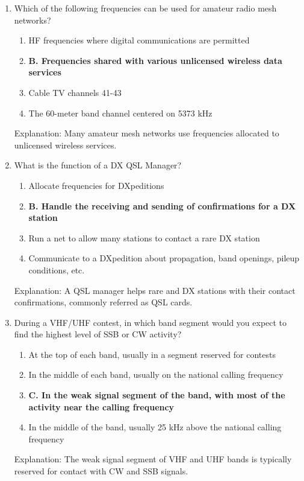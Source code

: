 \begin{enumerate}
    \item Which of the following frequencies can be used for amateur radio mesh networks?
        \begin{enumerate}
         \item  HF frequencies where digital communications are permitted
        \item \textbf{B. Frequencies shared with various unlicensed wireless data services}
     \item  Cable TV channels 41-43
       \item  The 60-meter band channel centered on 5373 kHz
     \end{enumerate}
        \textcolor{myred}{Explanation:}
     Many amateur mesh networks use frequencies allocated to unlicensed wireless services.

    \item What is the function of a DX QSL Manager?
        \begin{enumerate}
           \item  Allocate frequencies for DXpeditions
           \item \textbf{B. Handle the receiving and sending of confirmations for a DX station}
       \item  Run a net to allow many stations to contact a rare DX station
         \item  Communicate to a DXpedition about propagation, band openings, pileup conditions, etc.
       \end{enumerate}
        \textcolor{myred}{Explanation:}
     A QSL manager helps rare and DX stations with their contact confirmations, commonly referred as QSL cards.

   \item During a VHF/UHF contest, in which band segment would you expect to find the highest level of SSB or CW activity?
       \begin{enumerate}
     \item  At the top of each band, usually in a segment reserved for contests
      \item  In the middle of each band, usually on the national calling frequency
     \item \textbf{C. In the weak signal segment of the band, with most of the activity near the calling frequency}
     \item  In the middle of the band, usually 25 kHz above the national calling frequency
        \end{enumerate}
      \textcolor{myred}{Explanation:}
        The weak signal segment of VHF and UHF bands is typically reserved for contact with CW and SSB signals.


\end{enumerate}
